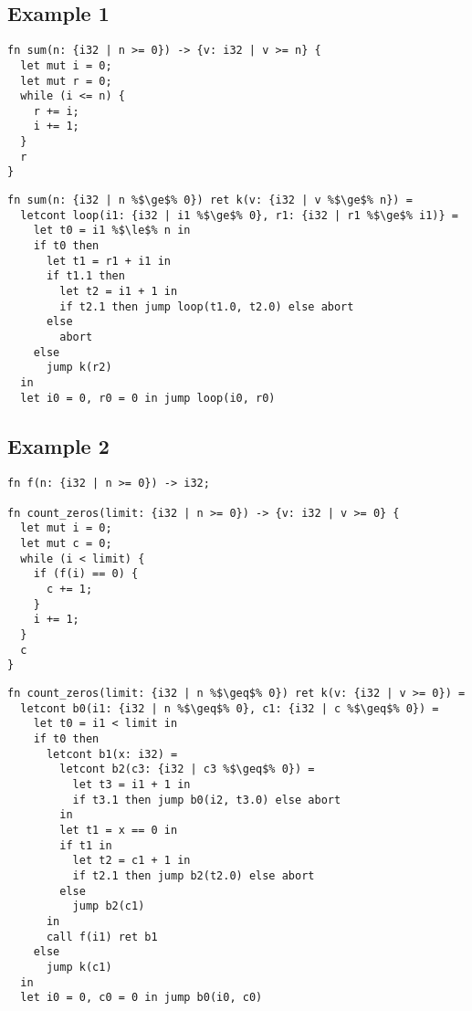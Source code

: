 \documentclass{article}
\begin{document}
\subsection{Example 1}

\begin{verbatim}
fn sum(n: {i32 | n >= 0}) -> {v: i32 | v >= n} {
  let mut i = 0;
  let mut r = 0;
  while (i <= n) {
    r += i;
    i += 1;
  }
  r
}
\end{verbatim}

\begin{verbatim}
fn sum(n: {i32 | n %$\ge$% 0}) ret k(v: {i32 | v %$\ge$% n}) =
  letcont loop(i1: {i32 | i1 %$\ge$% 0}, r1: {i32 | r1 %$\ge$% i1)} =
    let t0 = i1 %$\le$% n in
    if t0 then
      let t1 = r1 + i1 in
      if t1.1 then
        let t2 = i1 + 1 in
        if t2.1 then jump loop(t1.0, t2.0) else abort
      else
        abort
    else
      jump k(r2)
  in
  let i0 = 0, r0 = 0 in jump loop(i0, r0)
\end{verbatim}

\newpage
\subsection{Example 2}

\begin{verbatim}
fn f(n: {i32 | n >= 0}) -> i32;

fn count_zeros(limit: {i32 | n >= 0}) -> {v: i32 | v >= 0} {
  let mut i = 0;
  let mut c = 0;
  while (i < limit) {
    if (f(i) == 0) {
      c += 1;
    }
    i += 1;
  }
  c
}
\end{verbatim}

\begin{verbatim}
fn count_zeros(limit: {i32 | n %$\geq$% 0}) ret k(v: {i32 | v >= 0}) =
  letcont b0(i1: {i32 | n %$\geq$% 0}, c1: {i32 | c %$\geq$% 0}) =
    let t0 = i1 < limit in
    if t0 then
      letcont b1(x: i32) =
        letcont b2(c3: {i32 | c3 %$\geq$% 0}) =
          let t3 = i1 + 1 in
          if t3.1 then jump b0(i2, t3.0) else abort
        in
        let t1 = x == 0 in
        if t1 in
          let t2 = c1 + 1 in
          if t2.1 then jump b2(t2.0) else abort
        else
          jump b2(c1)
      in
      call f(i1) ret b1
    else
      jump k(c1)
  in
  let i0 = 0, c0 = 0 in jump b0(i0, c0)
\end{verbatim}
\end{document}
